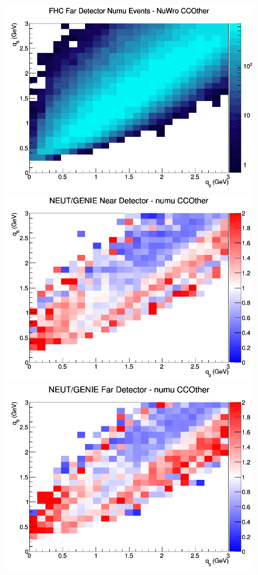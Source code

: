 \documentclass[12pt]{article}
\begin{document}
\begin{figure}[h]
\endminipage
{}
\includegraphics[width=\linewidth]{eff_q0_q3/FGT/CCOther_FHC_FD_numu_q3_q0_NuWro.png}
\endminipage
\newline
{}
\includegraphics[width=\linewidth]{eff_q0_q3/FGT/ratios/CCOther_NEUT_GENIE_numu_near_q3_q0.png}
\endminipage
{}
\includegraphics[width=\linewidth]{eff_q0_q3/FGT/ratios/CCOther_NEUT_GENIE_numu_far_q3_q0.png}

\end{figure}
\end{document}
